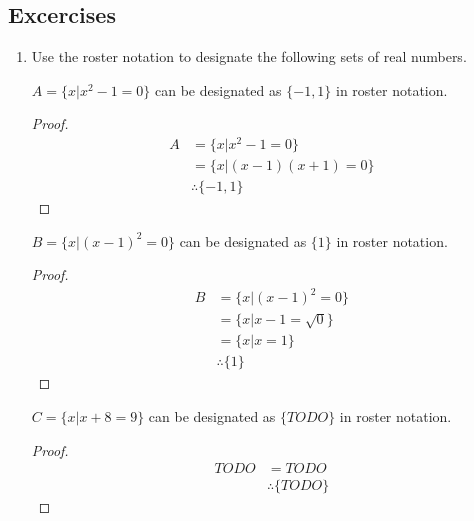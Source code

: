 \subsection{Excercises}

\begin{enumerate}
  \item Use the roster notation to designate the following sets of real numbers.
  
  \begin{proposition}
    $A = \{ x | x^2 - 1 = 0\}$ can be designated as $\{-1, 1\}$ in roster notation.
  \end{proposition}
  \begin{proof}
    \begin{equation}
      \begin{split}
        A & = \{x | x^2 - 1 = 0\} \\
        & = \{x | (x - 1)(x + 1) = 0\} \\
        & \therefore \{-1, 1\}
      \end{split}
    \end{equation}
  \end{proof}

  \begin{proposition}
    $B = \{x | (x-1)^2 = 0\}$ can be designated as $\{1\}$ in roster notation.
  \end{proposition}
  \begin{proof}
    \begin{equation}
      \begin{split}
        B & = \{x | (x-1)^2 = 0\} \\
        & = \{x | x-1 = \sqrt{0} \} \\
        & = \{x | x = 1 \} \\
        & \therefore \{1\}
      \end{split}
    \end{equation}
  \end{proof}

  \begin{proposition}
    $C = \{x | x + 8 = 9\}$ can be designated as $\{TODO\}$ in roster notation.
  \end{proposition}
  \begin{proof}
    \begin{equation}
      \begin{split}
        TODO & = TODO \\
        & \therefore \{TODO\}
      \end{split}
    \end{equation}
  \end{proof}


\end{enumerate}
